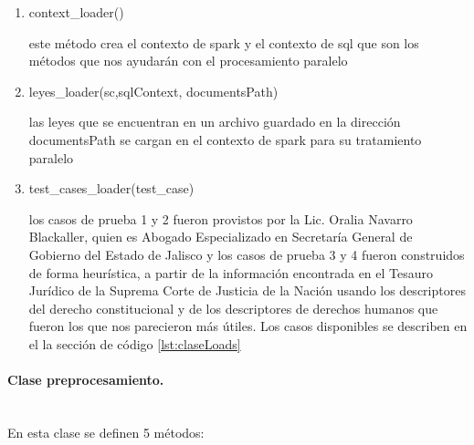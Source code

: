 \documentclass[12pt]{article}
\newcommand{\subsubsubsection}[1]{\paragraph{#1}\mbox{}\\}
\begin{document}
				\begin{enumerate}
				\item context\_loader()
				
				este método crea el contexto de spark y el contexto de sql que son los métodos que nos ayudarán con el procesamiento paralelo
				
				\item leyes\_loader(sc,sqlContext, documentsPath)
				
				las leyes que se encuentran en un archivo guardado en la dirección documentsPath se cargan en el contexto de spark para su tratamiento paralelo
				
				\item test\_cases\_loader(test\_case)
				
				los casos de prueba 1 y 2 fueron provistos por la Lic. Oralia Navarro Blackaller, quien es Abogado Especializado en Secretaría General de Gobierno del Estado de Jalisco y los casos de prueba 3 y 4 fueron construidos de forma heurística, a partir de la información encontrada en el Tesauro Jurídico de la Suprema Corte de Justicia de la Nación \cite{MedellinLuque2014} usando los descriptores del derecho constitucional y de los descriptores de derechos humanos que fueron los que nos parecieron más útiles. Los casos disponibles se describen en el la sección de código \ref{lst:claseLoads}
				 
				\end{enumerate}
				
				
				\subsubsubsection{Clase preprocesamiento.}
				En esta clase se definen 5 métodos:
			
\end{document}
